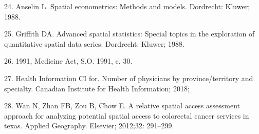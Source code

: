 \documentclass[10pt,letterpaper]{article}
\begin{document}
\hypertarget{ref-Anselin1988}{}
24. Anselin L. Spatial econometrics: Methods and models. Dordrecht:
Kluwer; 1988.

\hypertarget{ref-Griffith1988}{}
25. Griffith DA. Advanced spatial statistics: Special topics in the
exploration of quantitative spatial data series. Dordrecht: Kluwer;
1988.

\hypertarget{ref-Ontario1991}{}
26. 1991, Medicine Act, S.O. 1991, c. 30.

\hypertarget{ref-CIHI2018}{}
27. Health Information CI for. Number of physicians by
province/territory and specialty. Canadian Institute for Health
Information; 2018;

\hypertarget{ref-Wan2012SPAR}{}
28. Wan N, Zhan FB, Zou B, Chow E. A relative spatial access assessment
approach for analyzing potential spatial access to colorectal cancer
services in texas. Applied Geography. Elsevier; 2012;32: 291--299.

\nolinenumbers
\end{document}
